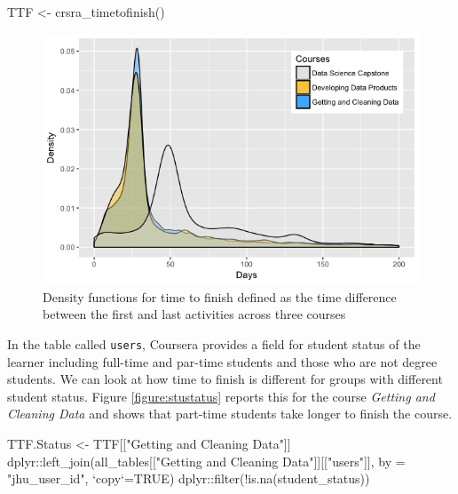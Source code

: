 \begin{Schunk}
\begin{Sinput}
TTF <- crsra_timetofinish()
\end{Sinput}
\end{Schunk}

\begin{figure}[htbp]
    \centering
    \includegraphics[scale=0.5]{timetofinish}
    \caption{Density functions for time to finish defined as the time difference between the first and last activities across three courses}
    \label{figure:timetofinish}
\end{figure}

In the table called \texttt{users}, Coursera provides a field for
student status of the learner including full-time and par-time students
and those who are not degree students. We can look at how time to finish
is different for groups with different student status. Figure
\ref{figure:stustatus} reports this for the course \emph{Getting and
Cleaning Data} and shows that part-time students take longer to finish
the course.

\begin{Schunk}
\begin{Sinput}
TTF.Status <- TTF[["Getting and Cleaning Data"]] %
    dplyr::left_join(all_tables[["Getting and Cleaning Data"]][["users"]], 
                     by = "jhu_user_id", `copy`=TRUE) %
    dplyr::filter(!is.na(student_status))
\end{Sinput}
\end{Schunk}


